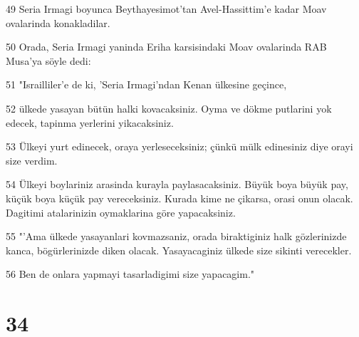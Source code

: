\par 49 Seria Irmagi boyunca Beythayesimot'tan Avel-Hassittim'e kadar Moav ovalarinda konakladilar.
\par 50 Orada, Seria Irmagi yaninda Eriha karsisindaki Moav ovalarinda RAB Musa'ya söyle dedi:
\par 51 "Israilliler'e de ki, 'Seria Irmagi'ndan Kenan ülkesine geçince,
\par 52 ülkede yasayan bütün halki kovacaksiniz. Oyma ve dökme putlarini yok edecek, tapinma yerlerini yikacaksiniz.
\par 53 Ülkeyi yurt edinecek, oraya yerleseceksiniz; çünkü mülk edinesiniz diye orayi size verdim.
\par 54 Ülkeyi boylariniz arasinda kurayla paylasacaksiniz. Büyük boya büyük pay, küçük boya küçük pay vereceksiniz. Kurada kime ne çikarsa, orasi onun olacak. Dagitimi atalarinizin oymaklarina göre yapacaksiniz.
\par 55 "'Ama ülkede yasayanlari kovmazsaniz, orada biraktiginiz halk gözlerinizde kanca, bögürlerinizde diken olacak. Yasayacaginiz ülkede size sikinti verecekler.
\par 56 Ben de onlara yapmayi tasarladigimi size yapacagim."

\chapter{34}

